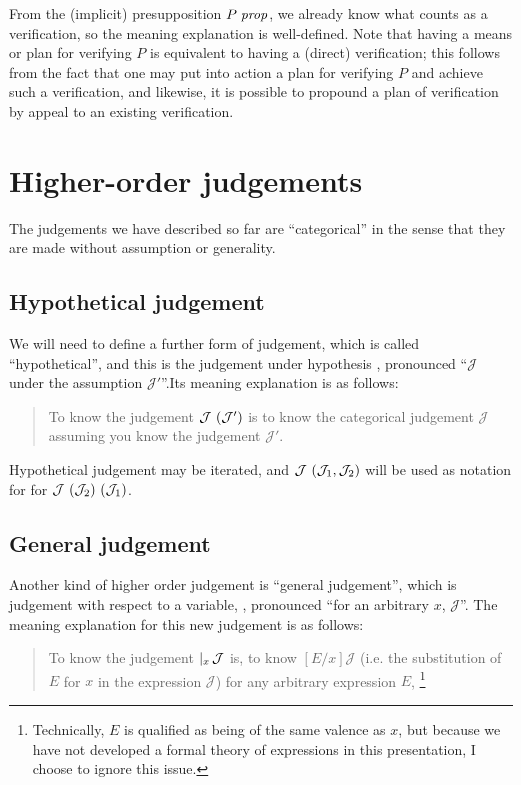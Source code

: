 \documentclass[main.tex]{subfiles}
\begin{document}
From the (implicit) presupposition $P\;\mathit{prop}$, we already know what
counts as a verification, so the meaning explanation is
well-defined. Note that having a means or plan for verifying $P$ is
equivalent to having a (direct) verification; this follows from the
fact that one may put into action a plan for verifying $P$ and achieve
such a verification, and likewise, it is possible to propound a plan
of verification by appeal to an existing verification.

\section{Higher-order judgements}

The judgements we have described so far are ``categorical'' in the sense that
they are made without assumption or generality.

\subsection{Hypothetical judgement}

We will need to define a further form of judgement, which is called
``hypothetical'', and this is the judgement under hypothesis
, pronounced
``$\mathcal{J}$ under the assumption $\mathcal{J}'$''.Its meaning
explanation is as follows:

\begin{quote}
  To know the judgement $\mathcal{J}\ (\mathcal{J}')$ is to know
  the categorical judgement $\mathcal{J}$ assuming you know the
  judgement $\mathcal{J}'$.
\end{quote}

Hypothetical judgement may be iterated, and
$\mathcal{J}\ (\mathcal{J}_1,\mathcal{J}_2)$ will be used as notation for
for $\mathcal{J}\ (\mathcal{J}_2)\ (\mathcal{J}_1)$.

\subsection{General judgement}

Another kind of higher order judgement is ``general judgement'', which
is judgement with respect to a variable,
, pronounced ``for an arbitrary $x$,
$\mathcal{J}$''. The meaning explanation for this new judgement is as
follows:

\begin{quote}
  To know the judgement $\lvert_{x}\,\mathcal{J}$ is, to know
$[E/x]\mathcal{J}$ (i.e. the substitution of $E$ for $x$ in the
expression $\mathcal{J}$) for any arbitrary expression $E$,
\footnote{Technically, $E$ is qualified as being of the same valence
as $x$, but because we have not developed a formal theory of
expressions in this presentation, I choose to ignore this issue.}
\end{quote}
\end{document}
